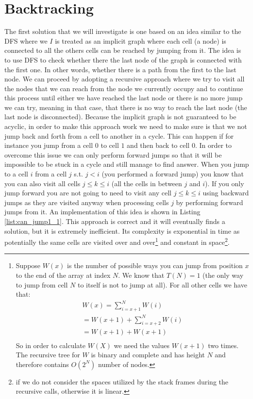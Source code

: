 \section{Backtracking}
\label{can_jump:sec:backtracking}
The first solution that we will investigate is one based on an idea similar to the DFS where we $I$
is treated as an implicit graph where each cell (a node) is connected to all the others cells can be
reached by jumping from it. The idea is to use DFS to check whether there the last node of the graph
is connected with the first one. In other words, whether there is a path from the first to the last
node. We can proceed by adopting a recursive approach where we try to visit all the nodes that we
can reach from the node we currently occupy and to continue this process until either we have
reached the last node or there is no more jump we can try, meaning in that case, that there is no
way to reach the last node (the last node is disconnected). Because the implicit graph is not
guaranteed to be acyclic, in order to make this approach work we need to make sure is that we not
jump back and forth from a cell to another in a cycle. This can happen if for instance you jump from
a cell $0$ to cell $1$ and then back to cell $0$. In order to overcome this issue we can only
perform forward jumps so that it will be impossible to be stuck in a cycle and still manage to find
answer. When you jump to a cell $i$ from a cell $j$ s.t. $j < i$ (you performed a forward jump) you
know that you can also visit all cells $ j \leq k \leq i$ (all the cells in between $j$ and $i$). If
you only jump forward you are not going to need to visit any cell $ j \leq k \leq i$ using backward
jumps as they are visited anyway when processing cells $j$ by performing forward jumps from it. An
implementation of this idea is shown in Listing \ref{list:can_jump1_1}. This approach is correct and
it will eventually finds a solution, 	but it is extremely inefficient. Its complexity is exponential
in time as potentially the same cells are visited over and over\footnote{Suppose $W(x)$ is the
number of possible ways you can jump from position $x$ to the end of the array at index $N$. We know
that $T(N) = 1$ (the only way to jump from cell $N$ to itself is not to jump at all). For all other
cells we have that:
	\begin{align*}
		W(x) = \sum_{i=x+1}^N W(i) \\
		 = W(x+1) + \sum_{i=x+2}^N W(i) \\
		 = W(x+1) + W(x+1) \\
	  \end{align*}
	So in order to calculate $W(X)$ we need the values  $W(x+1)$ two times. The recursive tree for
	$W$ is binary and complete and has height $N$ and therefore contains $O(2^N)$ number of nodes.}
	and constant in space\footnote{if we do not consider the spaces utilized by the stack frames
	during the recursive calls, otherwise it is linear.}.

